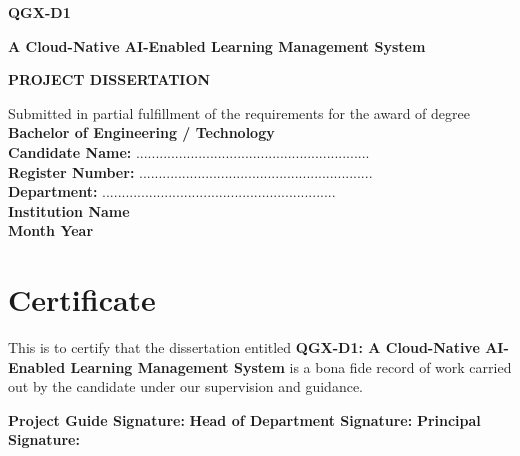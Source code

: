 \documentclass[12pt,a4paper]{article}
\renewcommand{\headrulewidth}{0.4pt}
\begin{document}

\fancyhf{}
\fancyfoot[C]{\thepage}
\fancyhead{}
\renewcommand{\headrulewidth}{0pt}

\begin{titlepage}
\centering
\vspace*{1.5cm}
{\bfseries\fontsize{18}{22}\selectfont QGX-D1\par}
\vspace{0.7cm}
{\bfseries\fontsize{16}{18}\selectfont A Cloud-Native AI-Enabled Learning Management System\par}
\vspace{1.2cm}
{\bfseries\fontsize{14}{16}\selectfont PROJECT DISSERTATION\par}
\vspace{1.2cm}
Submitted in partial fulfillment of the requirements for the award of degree\\
\vspace{0.7cm}
\textbf{Bachelor of Engineering / Technology}\\
\vspace{1.5cm}
\textbf{Candidate Name:} ............................................................\\
\vspace{0.4cm}
\textbf{Register Number:} ............................................................\\
\vspace{0.4cm}
\textbf{Department:} ............................................................\\
\vfill
\textbf{Institution Name}\\
\textbf{Month Year}
\end{titlepage}

\newpage
\section*{Certificate}
This is to certify that the dissertation entitled \textbf{QGX-D1: A Cloud-Native AI-Enabled Learning Management System} is a bona fide record of work carried out by the candidate under our supervision and guidance.

\vspace{2cm}
\noindent\textbf{Project Guide Signature:} \hrulefill
\vspace{1.2cm}
\noindent\textbf{Head of Department Signature:} \hrulefill
\vspace{1.2cm}
\noindent\textbf{Principal Signature:} \hrulefill
\end{document}
